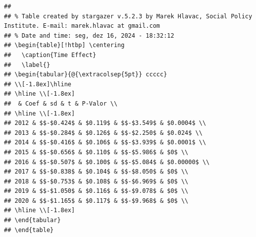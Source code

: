 \documentclass[
]{article}
\begin{document}
\begin{verbatim}
## 
## % Table created by stargazer v.5.2.3 by Marek Hlavac, Social Policy Institute. E-mail: marek.hlavac at gmail.com
## % Date and time: seg, dez 16, 2024 - 18:32:12
## \begin{table}[!htbp] \centering 
##   \caption{Time Effect} 
##   \label{} 
## \begin{tabular}{@{\extracolsep{5pt}} ccccc} 
## \\[-1.8ex]\hline 
## \hline \\[-1.8ex] 
##  & Coef & sd & t & P-Valor \\ 
## \hline \\[-1.8ex] 
## 2012 & $$-$0.424$ & $0.119$ & $$-$3.549$ & $0.0004$ \\ 
## 2013 & $$-$0.284$ & $0.126$ & $$-$2.250$ & $0.024$ \\ 
## 2014 & $$-$0.416$ & $0.106$ & $$-$3.939$ & $0.0001$ \\ 
## 2015 & $$-$0.656$ & $0.110$ & $$-$5.986$ & $0$ \\ 
## 2016 & $$-$0.507$ & $0.100$ & $$-$5.084$ & $0.00000$ \\ 
## 2017 & $$-$0.838$ & $0.104$ & $$-$8.050$ & $0$ \\ 
## 2018 & $$-$0.753$ & $0.108$ & $$-$6.969$ & $0$ \\ 
## 2019 & $$-$1.050$ & $0.116$ & $$-$9.078$ & $0$ \\ 
## 2020 & $$-$1.165$ & $0.117$ & $$-$9.968$ & $0$ \\ 
## \hline \\[-1.8ex] 
## \end{tabular} 
## \end{table}
\end{verbatim}
\end{document}
